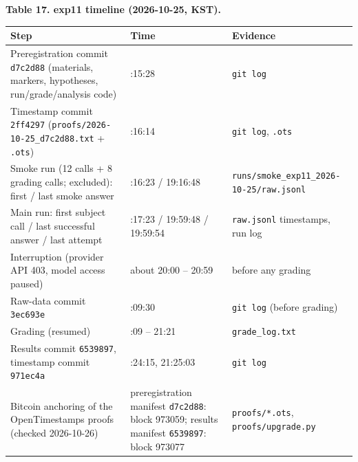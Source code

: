 \documentclass[10pt]{article}
\begin{document}
\textbf{Table 17. exp11 timeline (2026-10-25, KST).}

{\def\LTcaptype{none} %
\begin{longtable}[]{@{}
  >{\raggedright\arraybackslash}p{}
  >{\raggedright\arraybackslash}p{}
  >{\raggedright\arraybackslash}p{}@{}}
\toprule\noalign{}
\begin{minipage}[b]{\linewidth}\raggedright
Step
\end{minipage} & \begin{minipage}[b]{\linewidth}\raggedright
Time
\end{minipage} & \begin{minipage}[b]{\linewidth}\raggedright
Evidence
\end{minipage} \\
\midrule\noalign{}
\endhead
\bottomrule\noalign{}
\endlastfoot
Preregistration commit \texttt{d7c2d88} (materials, markers, hypotheses, run/grade/analysis code) & 19:15:28 & \texttt{git\ log} \\
Timestamp commit \texttt{2ff4297} (\texttt{proofs/\allowbreak{}2026-\allowbreak{}10-\allowbreak{}25\_\allowbreak{}d7c2d88.\allowbreak{}txt} + \texttt{.\allowbreak{}ots}) & 19:16:14 & \texttt{git\ log}, \texttt{.\allowbreak{}ots} \\
Smoke run (12 calls + 8 grading calls; excluded): first / last smoke answer & 19:16:23 / 19:16:48 & \texttt{runs/\allowbreak{}smoke\_\allowbreak{}exp11\_\allowbreak{}2026-\allowbreak{}10-\allowbreak{}25/\allowbreak{}raw.\allowbreak{}jsonl} \\
Main run: first subject call / last successful answer / last attempt & 19:17:23 / 19:59:48 / 19:59:54 & \texttt{raw.\allowbreak{}jsonl} timestamps, run log \\
Interruption (provider API 403, model access paused) & about 20:00 -- 20:59 & before any grading \\
Raw-data commit \texttt{3ec693e} & 21:09:30 & \texttt{git\ log} (before grading) \\
Grading (resumed) & 21:09 -- 21:21 & \texttt{grade\_\allowbreak{}log.\allowbreak{}txt} \\
Results commit \texttt{6539897}, timestamp commit \texttt{971ec4a} & 21:24:15, 21:25:03 & \texttt{git\ log} \\
Bitcoin anchoring of the OpenTimestamps proofs (checked 2026-10-26) & preregistration manifest \texttt{d7c2d88}: block 973059; results manifest \texttt{6539897}: block 973077 & \texttt{proofs/\allowbreak{}*.\allowbreak{}ots}, \texttt{proofs/\allowbreak{}upgrade.\allowbreak{}py} \\
\end{longtable}
}
\end{document}
